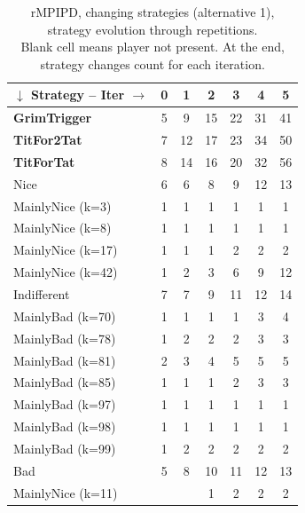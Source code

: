 \documentclass[journal,10pt,twoside]{IEEEtran}
\begin{document}
\begin{table}[ht]
    \caption{rMPIPD, changing strategies (alternative 1), strategy evolution through repetitions.\\
    Blank cell means player not present. At the end, strategy changes count for each iteration.}
    \label{tab:cripdmp}
    \centering
    \begin{minipage}{.4\textwidth}
    \begin{tabular}{l|cccccc} \toprule
        $\downarrow$ Strategy -- Iter $\rightarrow$ & 0 & 1 & 2 & 3 & 4 & 5 \\ \midrule
        \textbf{GrimTrigger} &   5 &   9 &   15 &   22 &   31 &   41 \\
        \textbf{TitFor2Tat}  &   7 &  12 &   17 &   23 &   34 &   50 \\
        \textbf{TitForTat}   &   8 &  14 &   16 &   20 &   32 &   56 \\
        Nice                 &   6 &   6 &    8 &    9 &   12 &   13 \\
        MainlyNice (k=3)     &   1 &   1 &    1 &    1 &    1 &    1 \\
        MainlyNice (k=8)     &   1 &   1 &    1 &    1 &    1 &    1 \\
        MainlyNice (k=17)    &   1 &   1 &    1 &    2 &    2 &    2 \\
        MainlyNice (k=42)    &   1 &   2 &    3 &    6 &    9 &   12 \\
        Indifferent          &   7 &   7 &    9 &   11 &   12 &   14 \\
        MainlyBad (k=70)     &   1 &   1 &    1 &    1 &    3 &    4 \\
        MainlyBad (k=78)     &   1 &   2 &    2 &    2 &    3 &    3 \\
        MainlyBad (k=81)     &   2 &   3 &    4 &    5 &    5 &    5 \\
        MainlyBad (k=85)     &   1 &   1 &    1 &    2 &    3 &    3 \\
        MainlyBad (k=97)     &   1 &   1 &    1 &    1 &    1 &    1 \\
        MainlyBad (k=98)     &   1 &   1 &    1 &    1 &    1 &    1 \\
        MainlyBad (k=99)     &   1 &   2 &    2 &    2 &    2 &    2 \\
        Bad                  &   5 &   8 &   10 &   11 &   12 &   13 \\
        MainlyNice (k=11)    &     &     &    1 &    2 &    2 &    2 \\

\end{tabular}
\end{minipage}
\end{table}
\end{document}
